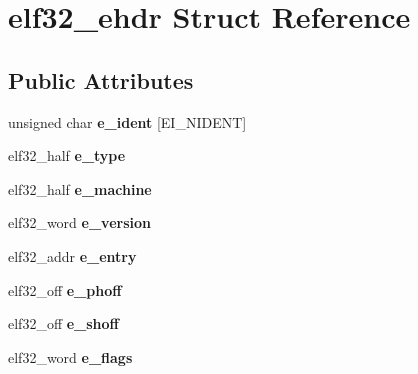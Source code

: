 \hypertarget{structelf32__ehdr}{}\section{elf32\+\_\+ehdr Struct Reference}
\label{structelf32__ehdr}
\subsection*{Public Attributes}
\begin{DoxyCompactItemize}
\item 
\hypertarget{structelf32__ehdr_aec11612de13263f526adb7205f96a7f0}{}unsigned char {\bfseries e\+\_\+ident} \mbox{[}E\+I\+\_\+\+N\+I\+D\+E\+N\+T\mbox{]}\label{structelf32__ehdr_aec11612de13263f526adb7205f96a7f0}

\item 
\hypertarget{structelf32__ehdr_ae26a4d5cc90917ec13689060695833e5}{}elf32\+\_\+half {\bfseries e\+\_\+type}\label{structelf32__ehdr_ae26a4d5cc90917ec13689060695833e5}

\item 
\hypertarget{structelf32__ehdr_a09a134b6c6b711458673ddc8601af4c5}{}elf32\+\_\+half {\bfseries e\+\_\+machine}\label{structelf32__ehdr_a09a134b6c6b711458673ddc8601af4c5}

\item 
\hypertarget{structelf32__ehdr_a4f73aa6711f379fb70a483e99d47f108}{}elf32\+\_\+word {\bfseries e\+\_\+version}\label{structelf32__ehdr_a4f73aa6711f379fb70a483e99d47f108}

\item 
\hypertarget{structelf32__ehdr_a2322a1ac85ac7962cd05152588f8bf8f}{}elf32\+\_\+addr {\bfseries e\+\_\+entry}\label{structelf32__ehdr_a2322a1ac85ac7962cd05152588f8bf8f}

\item 
\hypertarget{structelf32__ehdr_af25dd95c6c2b2e8aeecdfb130ed4bfc6}{}elf32\+\_\+off {\bfseries e\+\_\+phoff}\label{structelf32__ehdr_af25dd95c6c2b2e8aeecdfb130ed4bfc6}

\item 
\hypertarget{structelf32__ehdr_a085432a071a923e4fe1d3a4a3dfa665b}{}elf32\+\_\+off {\bfseries e\+\_\+shoff}\label{structelf32__ehdr_a085432a071a923e4fe1d3a4a3dfa665b}

\item 
\hypertarget{structelf32__ehdr_a1533636f5162a1f5a6e501a4129a5954}{}elf32\+\_\+word {\bfseries e\+\_\+flags}\label{structelf32__ehdr_a1533636f5162a1f5a6e501a4129a5954}


\end{DoxyCompactItemize}
